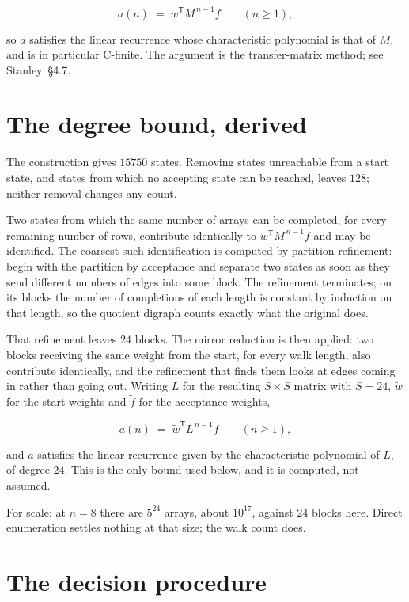 \documentclass[11pt]{article}
\theoremstyle{definition}
\begin{document}
\[a(n) \;=\; w^{\mathsf T} M^{\,n-1} f \qquad (n \ge 1),\]

so $a$ satisfies the linear recurrence whose characteristic polynomial is that of $M$, and is in particular C-finite. The argument is the transfer-matrix method; see Stanley~\S4.7.

\section{The degree bound, derived}

The construction gives $15750$ states. Removing states unreachable from a start state, and states from which no accepting state can be reached, leaves $128$; neither removal changes any count.

Two states from which the same number of arrays can be completed, for every remaining number of rows, contribute identically to $w^{\mathsf T}M^{\,n-1}f$ and may be identified. The coarsest such identification is computed by partition refinement: begin with the partition by acceptance and separate two states as soon as they send different numbers of edges into some block. The refinement terminates; on its blocks the number of completions of each length is constant by induction on that length, so the quotient digraph counts exactly what the original does.

That refinement leaves $24$ blocks. The mirror reduction is then applied: two blocks receiving the same weight from the start, for every walk length, also contribute identically, and the refinement that finds them looks at edges coming in rather than going out. Writing $L$ for the resulting $S \times S$ matrix with $S = 24$, $\tilde w$ for the start weights and $\tilde f$ for the acceptance weights,

\[a(n) \;=\; \tilde w^{\mathsf T} L^{\,n-1} \tilde f \qquad (n \ge 1),\]

and $a$ satisfies the linear recurrence given by the characteristic polynomial of $L$, of degree $24$. This is the only bound used below, and it is computed, not assumed.

For scale: at $n = 8$ there are $5^{24}$ arrays, about $10^{17}$, against $24$ blocks here. Direct enumeration settles nothing at that size; the walk count does.

\section{The decision procedure}
\end{document}
